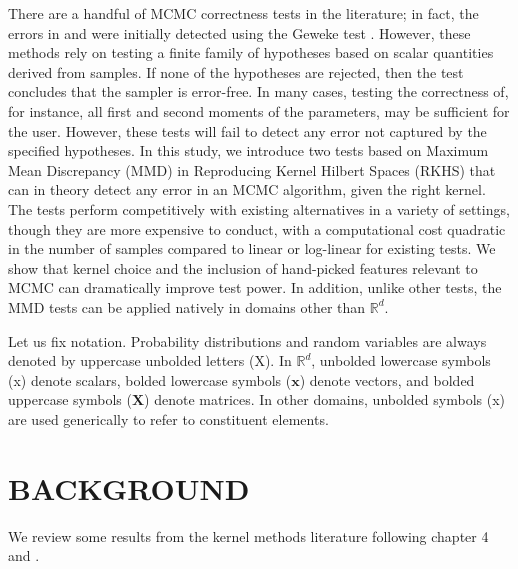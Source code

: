 \documentclass[a4paper,12pt]{article}
\begin{document}
There are a handful of MCMC correctness tests in the literature; in fact, the errors in \cite{del_negro_time_2015} and \cite{karlsson_corrigendum_2017} were initially detected using the Geweke test \cite{geweke_getting_2004}. However, these methods rely on testing a finite family of hypotheses based on scalar quantities derived from samples. If none of the hypotheses are rejected, then the test concludes that the sampler is error-free. In many cases, testing the correctness of, for instance, all first and second moments of the parameters, may be sufficient for the user. However, these tests will fail to detect any error not captured by the specified hypotheses. In this study, we introduce two tests based on Maximum Mean Discrepancy (MMD) in Reproducing Kernel Hilbert Spaces (RKHS) that can in theory detect any error in an MCMC algorithm, given the right kernel. The tests perform competitively with existing alternatives in a variety of settings, though they are more expensive to conduct, with a computational cost quadratic in the number of samples compared to linear or log-linear for existing tests. We show that kernel choice and the inclusion of hand-picked features relevant to MCMC can dramatically improve test power. In addition, unlike other tests, the MMD tests can be applied natively in domains other than $\mathbb{R}^{d}$.

Let us fix notation. Probability distributions and random variables are always denoted by uppercase unbolded letters (X). In $\mathbb{R}^{d}$, unbolded lowercase symbols (x) denote scalars, bolded lowercase symbols ($\mathbf{x}$) denote vectors, and bolded uppercase symbols ($\mathbf{X}$) denote matrices. In other domains, unbolded symbols (x) are used generically to refer to constituent elements.

\section{BACKGROUND}
We review some results from the kernel methods literature following \cite{steinwart_support_2008} chapter 4 and \cite{gretton_kernel_2012}.
\end{document}
